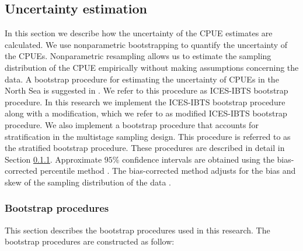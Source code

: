 \documentclass[a4paper 12pt]{article}
\numberwithin{equation}{section}
\newcommand{\ed}[1]{\textcolor{red}{#1}}
\begin{document}
\subsection{Uncertainty estimation}
\label{sec:uncertaintyestimation}
In this section we describe how the uncertainty of the CPUE estimates are calculated. We use nonparametric bootstrapping to quantify the uncertainty of the CPUEs. Nonparametric resampling allows us to estimate the sampling distribution of the CPUE empirically without making assumptions concerning the data. A bootstrap procedure for estimating the uncertainty of CPUEs in the North Sea is suggested in \citet{ICES2006Report}. We refer to this procedure as ICES-IBTS bootstrap procedure. In this research we implement the ICES-IBTS bootstrap procedure along with a modification, which we refer to as modified ICES-IBTS bootstrap procedure. We also implement a bootstrap procedure that accounts for stratification in the multistage sampling design. This procedure is referred to as the stratified bootstrap procedure. These procedures are described in detail in Section \ref{sec:datrasstratifiedbootstrap}. Approximate $95\%$ confidence intervals are obtained using the bias-corrected percentile method  \citep{carpenter2000bootstrap}. The bias-corrected method adjusts for the bias and skew of the sampling distribution of the data \citep{puth2015variety, karlsson2009bootstrap}. 

\subsubsection{Bootstrap procedures}
\label{sec:datrasstratifiedbootstrap}
This section describes the bootstrap procedures used in this research. The bootstrap procedures are constructed as follow:

\end{document}
